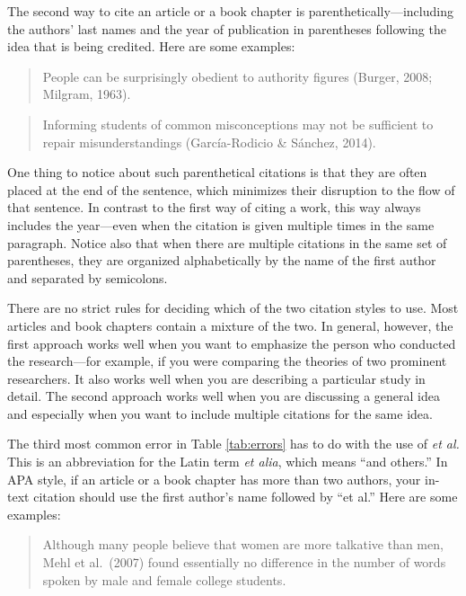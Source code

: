 \documentclass[
]{krantz}
\begin{document}
The second way to cite an article or a book chapter is parenthetically---including the authors' last names and the year of publication in parentheses following the idea that is being credited. Here are some examples:

\begin{quote}
People can be surprisingly obedient to authority figures (Burger, 2008; Milgram, 1963).
\end{quote}

\begin{quote}
Informing students of common misconceptions may not be sufficient to repair misunderstandings (García-Rodicio \& Sánchez, 2014).
\end{quote}

One thing to notice about such parenthetical citations is that they are often placed at the end of the sentence, which minimizes their disruption to the flow of that sentence. In contrast to the first way of citing a work, this way always includes the year---even when the citation is given multiple times in the same paragraph. Notice also that when there are multiple citations in the same set of parentheses, they are organized alphabetically by the name of the first author and separated by semicolons.

There are no strict rules for deciding which of the two citation styles to use. Most articles and book chapters contain a mixture of the two. In general, however, the first approach works well when you want to emphasize the person who conducted the research---for example, if you were comparing the theories of two prominent researchers. It also works well when you are describing a particular study in detail. The second approach works well when you are discussing a general idea and especially when you want to include multiple citations for the same idea.

The third most common error in Table \ref{tab:errors} has to do with the use of \emph{et al.} This is an abbreviation for the Latin term \emph{et alia}, which means ``and others.'' In APA style, if an article or a book chapter has more than two authors, your in-text citation should use the first author's name followed by ``et al.'' Here are some examples:

\begin{quote}
Although many people believe that women are more talkative than men, Mehl et al.~(2007) found essentially no difference in the number of words spoken by male and female college students.
\end{quote}
\end{document}
